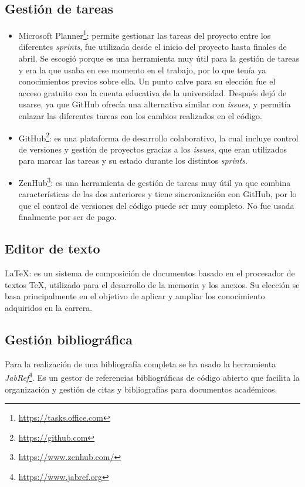 \subsection{Gestión de tareas}\label{gestión-de-tareas}
\begin{itemize}
    \item Microsoft Planner\label{planner}\footnote{\url{https://tasks.office.com}}: permite gestionar las tareas del proyecto entre los diferentes \textit{sprints}, fue utilizada desde el inicio del proyecto hasta finales de abril. Se escogió porque es una herramienta muy útil para la gestión de tareas y era la que usaba en ese momento en el trabajo, por lo que tenía ya conocimientos previos sobre ella. Un punto calve para su elección fue el acceso gratuito con la cuenta educativa de la universidad. Después dejó de usarse, ya que GitHub ofrecía una alternativa similar con \textit{issues}, y permitía enlazar las diferentes tareas con los cambios realizados en el código.
    \item GitHub\footnote{\url{https://github.com}}: es una plataforma de desarrollo colaborativo, la cual incluye control de versiones y gestión de proyectos gracias a los \textit{issues}, que eran utilizados para marcar las tareas y su estado durante los distintos \textit{sprints}.
    \item ZenHub\footnote{\url{https://www.zenhub.com/}}: es una herramienta de gestión de tareas muy útil ya que combina características de las dos anteriores y tiene sincronización con GitHub, por lo que el control de versiones del código puede ser muy completo. No fue usada finalmente por ser de pago.
\end{itemize}


\subsection{Editor de texto}
\LaTeX{}: es un sistema de composición de documentos basado en el procesador de textos TeX, utilizado para el desarrollo de la memoria y los anexos. Su elección se basa principalmente en el objetivo de aplicar y ampliar los conocimiento adquiridos en la carrera.



\subsection{Gestión bibliográfica}
Para la realización de una bibliografía completa se ha usado la herramienta \textit{JabRef}\footnote{\url{https://www.jabref.org}}. Es un gestor de referencias bibliográficas de código abierto que facilita la organización y gestión de citas y bibliografías para documentos académicos. 

